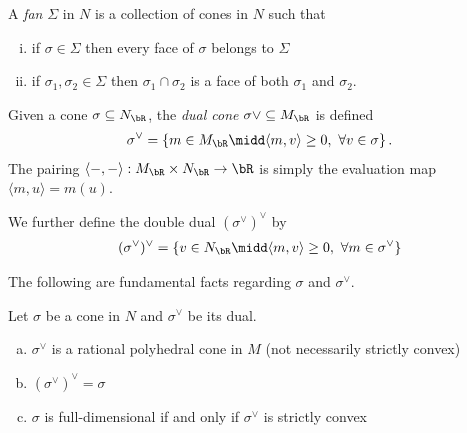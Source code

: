 \begin{defn}\label{defn:fan}
	A \emph{fan} $\Sigma$ in $N$ is a collection of cones in $N$ such that
	\begin{enumerate}[(i)]
		\item if $\sigma \in \Sigma$ then every face of $\sigma$ belongs to $\Sigma$ 
		\item if $\sigma_1,\sigma_2\in \Sigma$ then $\sigma_1\cap \sigma_2$ is a face of both $\sigma_1$ and $\sigma_2$.
	\end{enumerate}
\end{defn}
\begin{defn}\label{defn:dual-cone}
	Given a cone $\sigma \subseteq N_\bR$, the \emph{dual cone} $\sigma\vee \subseteq M_\bR$ is defined
	\begin{align*}
		\sigma^{\vee} = \left\{m \in M_\bR \midd \langle m,v\rangle \geq 0, ~\forall v \in \sigma\right\}.
	\end{align*}
	The pairing $\langle -,-\rangle: M_\bR \times N_\bR \to \bR$ is simply the evaluation map $\langle m,u\rangle = m(u)$.

	We further define the double dual $(\sigma^{\vee})^{\vee}$ by
	\begin{align*}
		(\sigma^{\vee})^{\vee} = \left\{v \in N_\bR \midd \langle m,v\rangle \geq 0, ~ \forall m \in \sigma^{\vee}\right\} 
	\end{align*}
\end{defn}
The following are fundamental facts regarding $\sigma$ and $\sigma^{\vee}$.
\begin{prop}\label{prop:facts-about-cones-and-duals}
	Let $\sigma$ be a cone in $N$ and $\sigma^{\vee}$ be its dual.
	\begin{enumerate}[(a)]
		\item $\sigma^{\vee}$ is a rational polyhedral cone in $M$ (not necessarily strictly convex)
		\item $(\sigma^{\vee})^{\vee} = \sigma$
		\item $\sigma$ is full-dimensional if and only if $\sigma^{\vee}$ is strictly convex
	\end{enumerate}
\end{prop}

